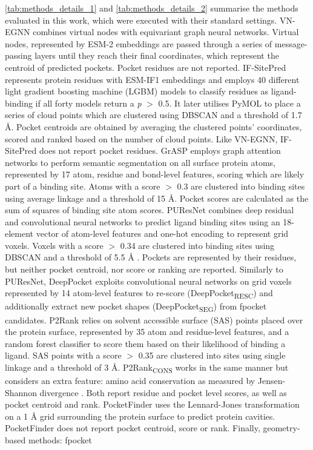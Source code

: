 \autoref{tab:methods_details_1} and \autoref{tab:methods_details_2} summarise the methods evaluated in this work, which were executed with their standard settings. VN-EGNN \cite{SESTAK_2024_VNEGNN} combines virtual nodes with equivariant graph neural networks. Virtual nodes, represented by ESM-2 embeddings \cite{RIVES_2021_EMBEDDINGS} are passed through a series of message-passing layers until they reach their final coordinates, which represent the centroid of predicted pockets. Pocket residues are not reported. IF-SitePred \cite{CARBERY_2024_IFSP} represents protein residues with ESM-IF1 embeddings \cite{HSU_2022_EMBEDDINGS} and employs 40 different light gradient boosting machine (LGBM) models \cite{KE_2017_LIGHTGBM} to classify residues as ligand-binding if all forty models return a \textit{p} $>$ 0.5. It later utilises PyMOL \cite{SCHRODINGER_2015_PYMOL} to place a series of cloud points which are clustered using DBSCAN \cite{ESTER_1996_DBSCAN}  and a threshold of 1.7 \AA{}. Pocket centroids are obtained by averaging the clustered points’ coordinates, scored and ranked based on the number of cloud points. Like VN-EGNN, IF-SitePred does not report pocket residues. GrASP \cite{SMITH_2024_GrASP} employs graph attention networks to perform semantic segmentation on all surface protein atoms, represented by 17 atom, residue and bond-level features, scoring which are likely part of a binding site. Atoms with a score $>$ 0.3 are clustered into binding sites using average linkage and a threshold of 15 \AA{}. Pocket scores are calculated as the sum of squares of binding site atom scores. PUResNet \cite{KANDEL_2021_PURESNET} combines deep residual and convolutional neural networks to predict ligand binding sites using an 18-element vector of atom-level features and one-hot encoding to represent grid voxels. Voxels with a score $>$ 0.34 are clustered into binding sites using DBSCAN and a threshold of 5.5 \AA{} \cite{KANDEL_2024_PURESNET}. Pockets are represented by their residues, but neither pocket centroid, nor score or ranking are reported. Similarly to PUResNet, DeepPocket \cite{AGGARWAL_2022_DEEPPOCKET} exploits convolutional neural networks on grid voxels represented by 14 atom-level features to re-score (DeepPocket\textsubscript{RESC}) and additionally extract new pocket shapes (DeepPocket\textsubscript{SEG}) from fpocket candidates. P2Rank \cite{KRIVAK_2018_P2RANK} relies on solvent accessible surface (SAS) points placed over the protein surface, represented by 35 atom and residue-level features, and a random forest classifier to score them based on their likelihood of binding a ligand. SAS points with a score $>$ 0.35 are clustered into sites using single linkage and a threshold of 3 \AA{}. P2Rank\textsubscript{CONS} \cite{JENDELE_2019_PRANKWEB} works in the same manner but considers an extra feature: amino acid conservation as measured by Jensen-Shannon divergence \cite{CAPRA_2007_JSD}. Both report residue and pocket level scores, as well as pocket centroid and rank. PocketFinder \cite{AN_2005_POCKETFINDER} uses the Lennard-Jones \cite{JONES_1924_POTENTIAL} transformation on a 1 \AA{} grid surrounding the protein surface to predict protein cavities. PocketFinder does not report pocket centroid, score or rank. Finally, geometry-based methods: fpocket 
